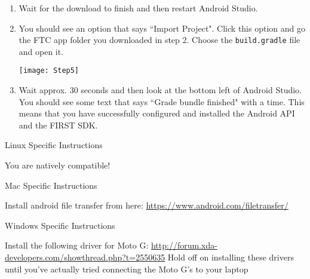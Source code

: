 \documentclass[11pt,fleqn]{article}
\begin{document}
\begin{enumerate}[1.]
\item
Wait for the download to finish and then restart Android Studio. 

\item
You should see an option that says ``Import Project". Click this option and go
the FTC app folder you downloaded in step 2. Choose the \texttt{build.gradle}
file and open it. 

\begin{center}
\texttt{[image: Step5]}
\end{center}

\item
Wait approx. 30 seconds and then look at the bottom left  of Android Studio. You
should see some text that says ``Grade bundle finished" with a time. This means
that you have successfully configured and installed the Android API and the
FIRST SDK. 
\end{enumerate}
\newpage
\begin{center}
Linux Specific Instructions
\end{center}
You are natively compatible!


\begin{center}
Mac Specific Instructions
\end{center}

Install android file transfer from here: \newline
\url{https://www.android.com/filetransfer/}

\begin{center}
Windows Specific Instructions
\end{center}

Install the following driver for Moto G: \newline
\url{http://forum.xda-developers.com/showthread.php?t=2550635}\newline
Hold off on installing these drivers until you've actually tried connecting the Moto G's to your
laptop
\end{document}
